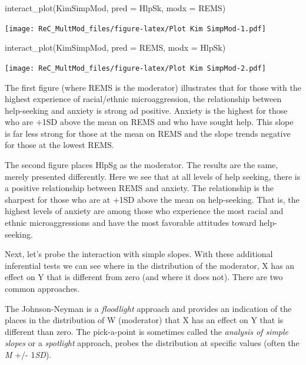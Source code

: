 \documentclass[
  english,
]{book}
\newenvironment{Shaded}{\begin{snugshade}}{\end{snugshade}}
\newcommand{\AttributeTok}[1]{\textcolor[rgb]{0.77,0.63,0.00}{#1}}
\newcommand{\FunctionTok}[1]{\textcolor[rgb]{0.00,0.00,0.00}{#1}}
\newcommand{\NormalTok}[1]{#1}
\begin{document}
\begin{Shaded}
\begin{Highlighting}[]
\FunctionTok{interact\_plot}\NormalTok{(KimSimpMod, }\AttributeTok{pred =}\NormalTok{ HlpSk, }\AttributeTok{modx =}\NormalTok{ REMS)}
\end{Highlighting}
\end{Shaded}

\texttt{[image: ReC\_MultMod\_files/figure-latex/Plot Kim SimpMod-1.pdf]}

\begin{Shaded}
\begin{Highlighting}[]
\FunctionTok{interact\_plot}\NormalTok{(KimSimpMod, }\AttributeTok{pred =}\NormalTok{ REMS, }\AttributeTok{modx =}\NormalTok{ HlpSk)}
\end{Highlighting}
\end{Shaded}

\texttt{[image: ReC\_MultMod\_files/figure-latex/Plot Kim SimpMod-2.pdf]}

The first figure (where REMS is the moderator) illustrates that for those with the highest experience of racial/ethnic microaggression, the relationship between help-seeking and anxiety is strong ad positive. Anxiety is the highest for those who are +1SD above the mean on REMS and who have sought help. This slope is far less strong for those at the mean on REMS and the slope trends negative for those at the lowest REMS.

The second figure places HlpSg as the moderator. The results are the same, merely presented differently. Here we see that at all levels of help seeking, there is a positive relationship between REMS and anxiety. The relationship is the sharpest for those who are at +1SD above the mean on help-seeking. That is, the highest levels of anxiety are among those who experience the most racial and ethnic microaggressions and have the most favorable attitudes toward help-seeking.

Next, let's probe the interaction with simple slopes. With these additional inferential tests we can see where in the distribution of the moderator, X has an effect on Y that is different from zero (and where it does not). There are two common approaches.

The Johnson-Neyman is a \emph{floodlight} approach and provides an indication of the places in the distribution of W (moderator) that X has an effect on Y that is different than zero. The pick-a-point is sometimes called the \emph{analysis of simple slopes} or a \emph{spotlight} approach, probes the distribution at specific values (often the \emph{M} +/- 1\emph{SD}).
\end{document}
